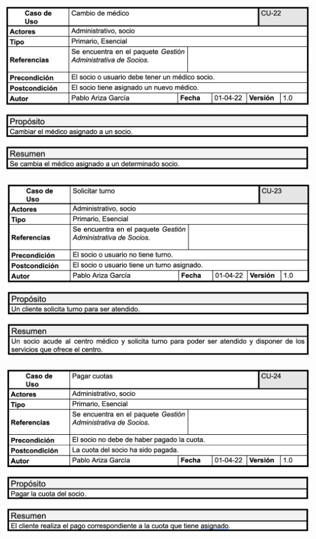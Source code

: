 \documentclass[12pt, spanish]{article}
\begin{document}
\begin{centering}\includegraphics[scale = 0.70]{casos_de_uso/22.png}\\[1.0 cm]\end{centering}
\begin{centering}\includegraphics[scale = 0.70]{casos_de_uso/23.png}\\[1.0 cm]\end{centering}
\begin{centering}\includegraphics[scale = 0.70]{casos_de_uso/24.png}\\[1.0 cm]\end{centering}
\end{document}
